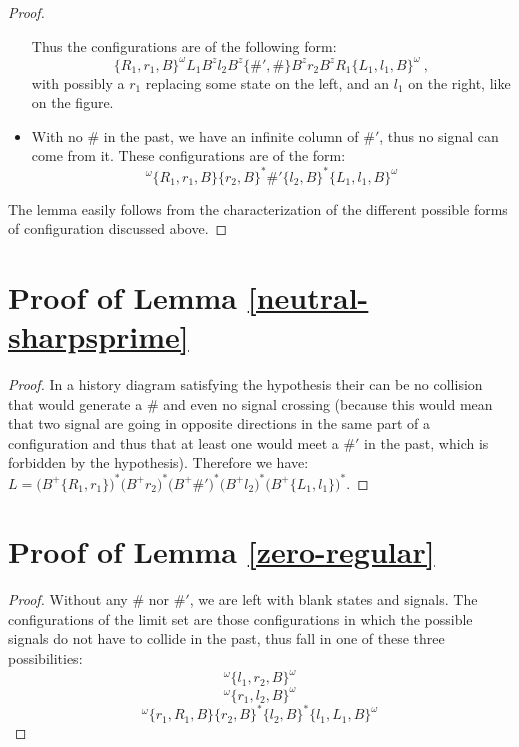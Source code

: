 \documentclass{jac}
\theoremstyle{definition}
\begin{document}
\begin{proof}
\begin{itemize}
\begin{center}
        \end{center}
        Thus the configurations are of the following form:
        $$\{R_1,r_1,B\}^\omega L_1B^zl_2B^z\{\#',\#\}
        B^zr_2B^zR_1\{L_1,l_1,B\}^\omega~,$$
        with possibly a $r_1$ replacing some state on the left,
        and an $l_1$ on the right, like on the figure.

      \item With no $\#$ in the past, we have an infinite column of $\#'$, 
        thus no signal can come from it. These configurations are of the form:
        $$^\omega\{R_1,r_1,B\}\{r_2,B\}^*\#'\{l_2,B\}^*\{L_1,l_1,B\}^\omega$$
    \end{itemize}
    The lemma easily follows from the characterization of the different possible
    forms of configuration discussed above.
  \end{proof}

\section{Proof of Lemma   \ref{neutral-sharpsprime}}
  \begin{proof}
    In a history diagram satisfying the hypothesis their can be no collision that would generate a $\#$ and even no signal crossing (because this would mean that two signal are going in opposite directions in the same part of a configuration and thus that at least one would meet a $\#'$ in the past, which is forbidden by the hypothesis).     Therefore we have: $L=\bigl(B^+\{R_1,r_1\}\bigr)^\ast\bigl(B^+ r_2\bigr)^\ast\bigl(B^+\#'\bigr)^\ast\bigl(B^+ l_2\bigr)^\ast\bigl(B^+ \{L_1,l_1\}\bigr)^\ast$.
  \end{proof}

\section{Proof of Lemma \ref{zero-regular}}
  \begin{proof}
  Without any $\#$ nor $\#'$, we are left with blank states and signals.
  The configurations of the limit set are those configurations in which the
  possible signals do not have to collide in the past, thus fall in one of these
  three possibilities:
  $$^\omega\{l_1,r_2,B\}^\omega$$
  $$^\omega\{r_1,l_2,B\}^\omega$$
  $$^\omega\{r_1,R_1,B\}\{r_2,B\}^*\{l_2,B\}^*\{l_1,L_1,B\}^\omega$$
  \end{proof}
\end{document}
